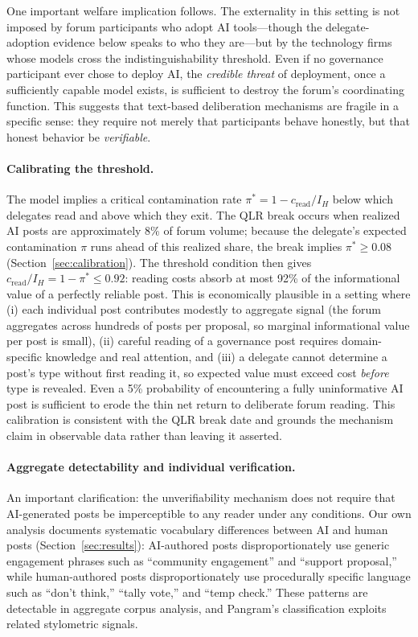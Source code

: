 \documentclass[12pt]{article}
\begin{document}
One important welfare implication follows. The externality in this setting is not
imposed by forum participants who adopt AI tools---though the delegate-adoption evidence
below speaks to who they are---but by the technology firms whose models cross the
indistinguishability threshold. Even if no governance participant ever chose to
deploy AI, the \emph{credible threat} of deployment, once a sufficiently capable
model exists, is sufficient to destroy the forum's coordinating function. This
suggests that text-based deliberation mechanisms are fragile in a specific sense:
they require not merely that participants behave honestly, but that honest behavior
be \emph{verifiable}.

\paragraph{Calibrating the threshold.}
The model implies a critical contamination rate $\pi^* = 1 - c_{\text{read}} / I_H$
below which delegates read and above which they exit. The QLR break occurs when
realized AI posts are approximately 8\% of forum volume; because the delegate's
expected contamination $\pi$ runs ahead of this realized share, the break implies
$\pi^* \ge 0.08$ (Section~\ref{sec:calibration}).
The threshold condition then gives $c_{\text{read}} / I_H = 1 - \pi^* \le 0.92$:
reading costs absorb at most 92\% of the informational value of a perfectly reliable post.
This is economically plausible in a setting where (i) each individual post
contributes modestly to aggregate signal (the forum aggregates across hundreds of
posts per proposal, so marginal informational value per post is small), (ii) careful
reading of a governance post requires domain-specific knowledge and real attention,
and (iii) a delegate cannot determine a post's type without first reading it, so
expected value must exceed cost \emph{before} type is revealed. Even a 5\%
probability of encountering a fully uninformative AI post is sufficient to erode
the thin net return to deliberate forum reading. This calibration is consistent
with the QLR break date and grounds the mechanism claim in observable data rather
than leaving it asserted.

\paragraph{Aggregate detectability and individual verification.}
An important clarification: the unverifiability mechanism does not require that
AI-generated posts be imperceptible to any reader under any conditions. Our own
analysis documents systematic vocabulary differences between AI and human posts
(Section~\ref{sec:results}): AI-authored posts disproportionately use generic
engagement phrases such as ``community engagement'' and ``support proposal,''
while human-authored posts disproportionately use procedurally specific language
such as ``don't think,'' ``tally vote,'' and ``temp check.'' These patterns are
detectable in aggregate corpus analysis, and Pangram's classification exploits
related stylometric signals.
\end{document}
